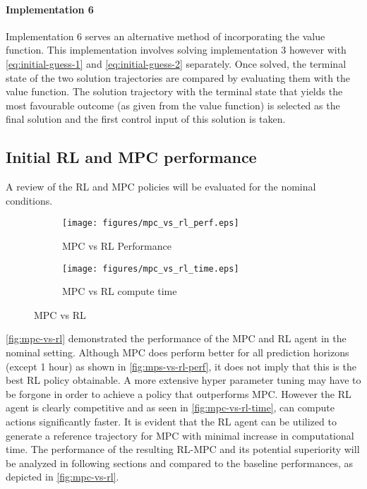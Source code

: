 \paragraph{Implementation 6}
Implementation 6 serves an alternative method of incorporating the value function. This implementation involves solving implementation 3 however with \autoref{eq:initial-guess-1} and \autoref{eq:initial-guess-2} separately. Once solved, the terminal state of the two solution trajectories are compared by evaluating them with the value function. The solution trajectory with the terminal state that yields the most favourable outcome (as given from the value function) is selected as the final solution and the first control input of this solution is taken. 



\subsection{Initial RL and MPC performance}
A review of the RL and MPC policies will be evaluated for the nominal conditions.

\begin{figure}[H]
	\centering
	\begin{subfigure}[b]{0.49\textwidth}
		\centering
		\texttt{[image: figures/mpc\_vs\_rl\_perf.eps]}
		\caption{MPC vs RL Performance}
		\label{fig:mps-vs-rl-perf}
	\end{subfigure}
	\hfill
	\begin{subfigure}[b]{0.49\textwidth}
		\centering
		\texttt{[image: figures/mpc\_vs\_rl\_time.eps]}
		\caption{MPC vs RL compute time}
		\label{fig:mpc-vs-rl-time}
	\end{subfigure}
	\caption{MPC vs RL}
	\label{fig:mpc-vs-rl}
\end{figure}

\autoref{fig:mpc-vs-rl} demonstrated the performance of the MPC and RL agent in the nominal setting. Although MPC does perform better for all prediction horizons (except 1 hour) as shown in \autoref{fig:mps-vs-rl-perf}, it does not imply that this is the best RL policy obtainable. A more extensive hyper parameter tuning may have to be forgone in order to achieve a policy that outperforms MPC. However the RL agent is clearly competitive and as seen in \autoref{fig:mpc-vs-rl-time}, can compute actions significantly faster. It is evident that the RL agent can be utilized to generate a reference trajectory for MPC with minimal increase in computational time. The performance of the resulting RL-MPC and its potential superiority will be analyzed in following sections and compared to the baseline performances, as depicted in \autoref{fig:mpc-vs-rl}.

